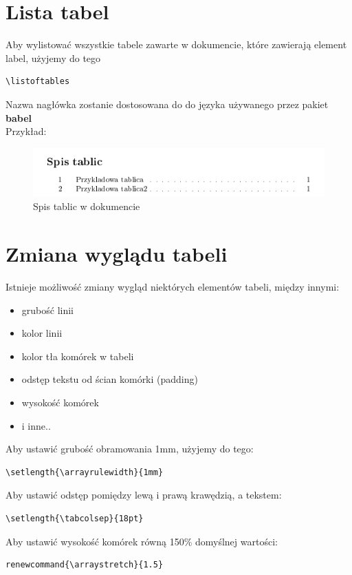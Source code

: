 \documentclass[table]{beamer}
\begin{document}
\section{Lista tabel}
\begin{frame}[fragile]
Aby wylistować wszystkie tabele zawarte w dokumencie, które zawierają element label, użyjemy do tego 
\begin{verbatim}
\listoftables
\end{verbatim}
Nazwa nagłówka zostanie dostosowana do do języka używanego przez pakiet \textbf{babel}\\
Przykład:
\begin{figure}
	\includegraphics[scale=.6]{spis_tablic.png}
	\caption{Spis tablic w dokumencie}
\end{figure}
\end{frame}








\section{Zmiana wyglądu tabeli}
\begin{frame}[fragile]
Istnieje możliwość zmiany wygląd niektórych elementów tabeli, między innymi:
\begin{itemize}
	\item grubość linii
	\item kolor linii
	\item kolor tła komórek w tabeli
	\item odstęp tekstu od ścian komórki (padding)
	\item wysokość komórek
	\item i inne.. 
\end{itemize}


\end{frame}

\begin{frame}[fragile]
Aby ustawić grubość obramowania 1mm, użyjemy do tego:
\begin{verbatim}
\setlength{\arrayrulewidth}{1mm}
\end{verbatim}


Aby ustawić odstęp pomiędzy lewą i prawą krawędzią, a tekstem:
\begin{verbatim}
\setlength{\tabcolsep}{18pt}
\end{verbatim}

Aby ustawić wysokość komórek równą 150\% domyślnej wartości: 
\begin{verbatim}
renewcommand{\arraystretch}{1.5}
\end{verbatim}


\end{frame}
\end{document}
